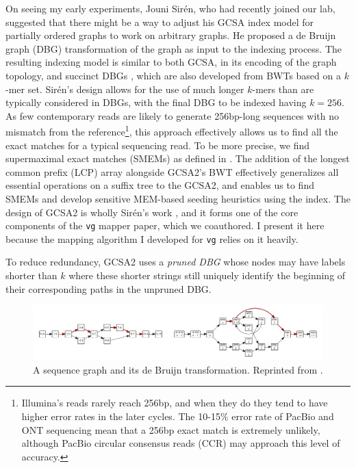 On seeing my early experiments, Jouni Sir\'{e}n, who had recently joined our lab, suggested that there might be a way to adjust his GCSA index model for partially ordered graphs to work on arbitrary graphs.
He proposed a de Bruijn graph (DBG) transformation of the graph as input to the indexing process.
The resulting indexing model is similar to both GCSA, in its encoding of the graph topology, and succinct DBGs \cite{bowe2012succinct}, which are also developed from BWTs based on a $k$-mer set.
Sir\'{e}n's design allows for the use of much longer $k$-mers than are typically considered in DBGs, with the final DBG to be indexed having $k=256$.
As few contemporary reads are likely to generate 256bp-long sequences with no mismatch from the reference\footnote{Illumina's reads rarely reach 256bp, and when they do they tend to have higher error rates in the later cycles. The 10-15\% error rate of PacBio and ONT sequencing mean that a 256bp exact match is extremely unlikely, although PacBio circular consensus reads (CCR) may approach this level of accuracy.}, this approach effectively allows us to find all the exact matches for a typical sequencing read.
To be more precise, we find supermaximal exact matches (SMEMs) as defined in \cite{li2013aligning}.
The addition of the longest common prefix (LCP) array alongside GCSA2's BWT effectively generalizes all essential operations on a suffix tree to the GCSA2, and enables us to find SMEMs and develop sensitive MEM-based seeding heuristics using the index.
The design of GCSA2 is wholly Sir\'{e}n's work \cite{siren2017indexing}, and it forms one of the core components of the {\tt vg} mapper paper, which we coauthored.
I present it here because the mapping algorithm I developed for {\tt vg} relies on it heavily.

To reduce redundancy, GCSA2 uses a \emph{pruned DBG} whose nodes may have labels shorter than $k$ where these shorter strings still uniquely identify the beginning of their corresponding paths in the unpruned DBG.

\begin{figure}[htbp!]
  \includegraphics[width=\textwidth]{Chapter2/Figs/sequence_graph_to_DBG.pdf}
  \caption[A sequence graph and its de Bruijn transformation]{
    A sequence graph and its de Bruijn transformation.
    Reprinted from \cite{siren2017indexing}.
  }
  \label{fig:seq_graph_to_dbg}
\end{figure}


